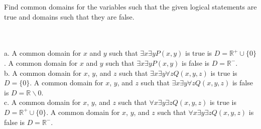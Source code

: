 Find common domains for the variables such that the given logical statements are true and domains such
that they are false.\\\\

\begin{solution}\renewcommand{\qedsymbol}{}\ \\
    a. A common domain for $x$ and $y$ such that $\exists x\exists yP(x,y)$ is true is
    $D=\mathbb{R}^{+}\cup\{0\}$. A common domain for $x$ and $y$ such that $\exists x\exists yP(x,y)$ is
    false is $D=\mathbb{R}^{-}$.\\

    b. A common domain for $x$, $y$, and $z$ such that $\exists x\exists y\forall zQ(x,y,z)$ is true is
    $D=\{0\}$. A common domain for $x$, $y$, and $z$ such that $\exists x\exists y\forall zQ(x,y,z)$ is
    false is $D=\mathbb{R}\backslash {0}$.\\

    c. A common domain for $x$, $y$, and $z$ such that $\forall x\exists y\exists zQ(x,y,z)$ is true is
    $D=\mathbb{R}^{+}\cup \{0\}$. A common domain for $x$, $y$, and $z$ such that
    $\forall x\exists y\exists zQ(x,y,z)$ is false is $D=\mathbb{R}^{-}$.

\end{solution}